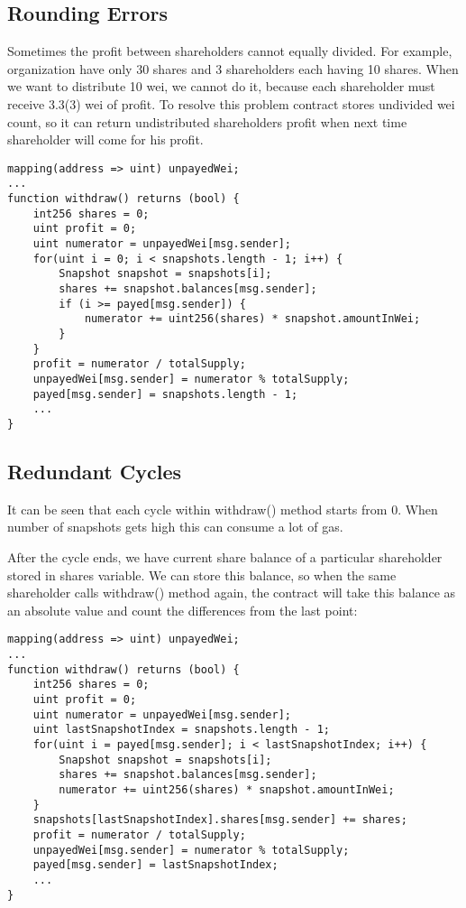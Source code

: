 \documentclass[onecolumn]{article}
\begin{document}
\subsection{Rounding Errors}
Sometimes the profit between shareholders cannot equally divided. For example, organization have only 30 shares and 3 shareholders each having 10 shares. When we want to distribute 10 wei, we cannot do it, because each shareholder must receive 3.3(3) wei of profit. To resolve this problem contract stores undivided wei count, so it can return undistributed shareholders profit when next time shareholder will come for his profit.
\begin{lstlisting}
mapping(address => uint) unpayedWei;
...
function withdraw() returns (bool) {
	int256 shares = 0;
	uint profit = 0;
	uint numerator = unpayedWei[msg.sender];
	for(uint i = 0; i < snapshots.length - 1; i++) {
		Snapshot snapshot = snapshots[i];
		shares += snapshot.balances[msg.sender];
		if (i >= payed[msg.sender]) {
			numerator += uint256(shares) * snapshot.amountInWei;
		}
	}
	profit = numerator / totalSupply;
	unpayedWei[msg.sender] = numerator % totalSupply;
	payed[msg.sender] = snapshots.length - 1;
	...
}
\end{lstlisting}
\subsection{Redundant Cycles}
It can be seen that each cycle within withdraw() method starts from 0. When number of snapshots gets high this can consume a lot of gas.

After the cycle ends, we have current share balance of a particular shareholder stored in shares variable. We can store this balance, so when the same shareholder calls withdraw() method again, the contract will take this balance as an absolute value and count the differences from the last point:
\begin{lstlisting}
mapping(address => uint) unpayedWei;
...
function withdraw() returns (bool) {
	int256 shares = 0;
	uint profit = 0;
	uint numerator = unpayedWei[msg.sender];
	uint lastSnapshotIndex = snapshots.length - 1;
	for(uint i = payed[msg.sender]; i < lastSnapshotIndex; i++) {
		Snapshot snapshot = snapshots[i];
		shares += snapshot.balances[msg.sender];
		numerator += uint256(shares) * snapshot.amountInWei;
	}
	snapshots[lastSnapshotIndex].shares[msg.sender] += shares;
	profit = numerator / totalSupply;
	unpayedWei[msg.sender] = numerator % totalSupply;
	payed[msg.sender] = lastSnapshotIndex;
	...
}
\end{lstlisting}
\end{document}
